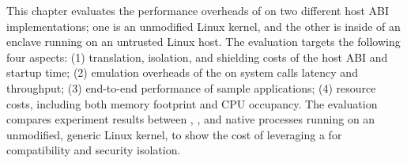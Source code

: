 This chapter evaluates the performance overheads of \graphene{}
on two different host ABI implementations;
one is an unmodified Linux kernel, and the other is inside of an \sgx{} enclave running on an untrusted Linux host.
The evaluation
targets the following four aspects:
(1) translation, isolation, and shielding costs of the host ABI and startup time;
(2) emulation overheads of the \libos{} on system calls latency and throughput;
(3) end-to-end performance of sample applications;
(4) resource costs, including both memory footprint and CPU occupancy.
The evaluation compares experiment results
between \graphene{}, \graphenesgx{}, and native processes running on an unmodified, generic Linux kernel,
to show the cost of leveraging a \libos{} for compatibility and security isolation.










